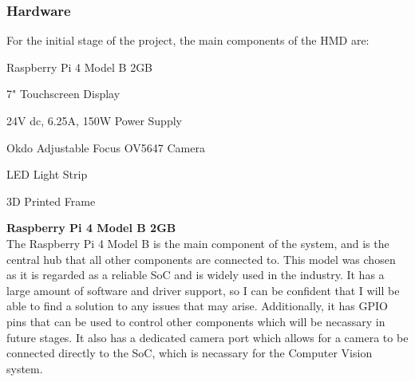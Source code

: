 \subsubsection{Hardware}
For the initial stage of the project, the main components of the HMD are:
\begin{mylist}
  \item Raspberry Pi 4 Model B 2GB
  \item 7" Touchscreen Display
  \item 24V dc, 6.25A, 150W Power Supply
  \item Okdo Adjustable Focus OV5647 Camera
  \item LED Light Strip
  \item 3D Printed Frame
\end{mylist}
\textbf{Raspberry Pi 4 Model B 2GB} \\
The Raspberry Pi 4 Model B is the main component of the system, and is the central hub that all other components are connected to.
This model was chosen as it is regarded as a reliable SoC and is widely used in the industry. It has a large amount of software
and driver support, so I can be confident that I will be able to find a solution to any issues that may arise. Additionally, 
it has GPIO pins that can be used to control other components which will be necassary in future stages. It also has a 
dedicated camera port which allows for a camera to be connected directly to the SoC, which is necassary for the Computer Vision system.

